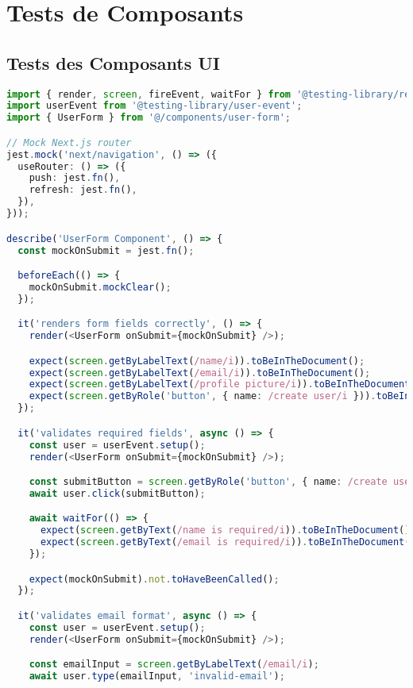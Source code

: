 \section{Tests de Composants}

\subsection{Tests des Composants UI}

\begin{lstlisting}[language=TypeScript, caption=Tests de composants React]
import { render, screen, fireEvent, waitFor } from '@testing-library/react';
import userEvent from '@testing-library/user-event';
import { UserForm } from '@/components/user-form';

// Mock Next.js router
jest.mock('next/navigation', () => ({
  useRouter: () => ({
    push: jest.fn(),
    refresh: jest.fn(),
  }),
}));

describe('UserForm Component', () => {
  const mockOnSubmit = jest.fn();

  beforeEach(() => {
    mockOnSubmit.mockClear();
  });

  it('renders form fields correctly', () => {
    render(<UserForm onSubmit={mockOnSubmit} />);

    expect(screen.getByLabelText(/name/i)).toBeInTheDocument();
    expect(screen.getByLabelText(/email/i)).toBeInTheDocument();
    expect(screen.getByLabelText(/profile picture/i)).toBeInTheDocument();
    expect(screen.getByRole('button', { name: /create user/i })).toBeInTheDocument();
  });

  it('validates required fields', async () => {
    const user = userEvent.setup();
    render(<UserForm onSubmit={mockOnSubmit} />);

    const submitButton = screen.getByRole('button', { name: /create user/i });
    await user.click(submitButton);

    await waitFor(() => {
      expect(screen.getByText(/name is required/i)).toBeInTheDocument();
      expect(screen.getByText(/email is required/i)).toBeInTheDocument();
    });

    expect(mockOnSubmit).not.toHaveBeenCalled();
  });

  it('validates email format', async () => {
    const user = userEvent.setup();
    render(<UserForm onSubmit={mockOnSubmit} />);

    const emailInput = screen.getByLabelText(/email/i);
    await user.type(emailInput, 'invalid-email');


\end{lstlisting}
